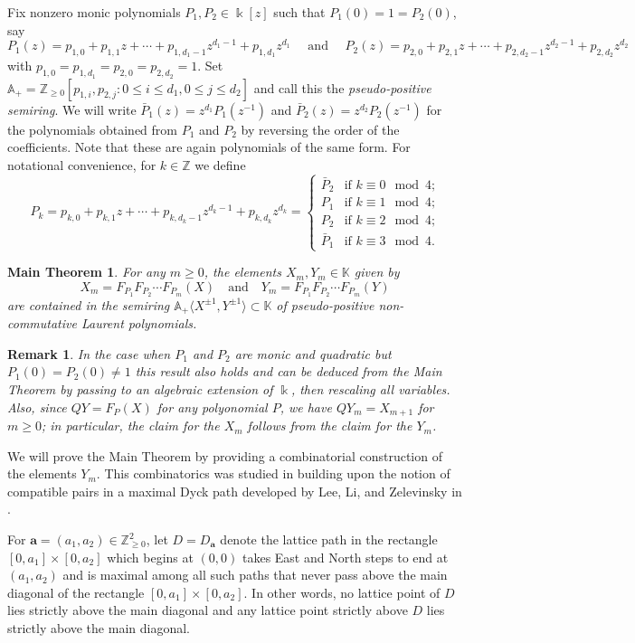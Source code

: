 \documentclass{amsart}
\newtheorem*{maintheorem}{Main Theorem}
\newtheorem*{remark*}{Remark}
\newcommand{\bfa}{\mathbf{a}}
\newcommand{\kk}{\Bbbk}
\renewcommand{\AA}{\mathbb{A}}
\newcommand{\KK}{\mathbb{K}}
\newcommand{\ZZ}{\mathbb{Z}}
\begin{document}
Fix nonzero monic polynomials $P_1,P_2\in\kk[z]$ such that $P_1(0)=1=P_2(0)$, say
\[P_1(z)=p_{1,0}+p_{1,1}z+\cdots+p_{1,d_1-1}z^{d_1-1}+p_{1,d_1}z^{d_1}\quad\!\text{ and }\!\quad P_2(z)=p_{2,0}+p_{2,1}z+\cdots+p_{2,d_2-1}z^{d_2-1}+p_{2,d_2}z^{d_2}\]
with $p_{1,0}=p_{1,d_1}=p_{2,0}=p_{2,d_2}=1$.  Set $\AA_+=\ZZ_{\ge0}[p_{1,i},p_{2,j}:0\le i\le d_1,0\le j\le d_2]$ and call this the \emph{pseudo-positive semiring}.  We will write $\bar{P}_1(z)=z^{d_1}P_1(z^{-1})$ and $\bar{P}_2(z)=z^{d_2}P_2(z^{-1})$ for the polynomials obtained from $P_1$ and $P_2$ by reversing the order of the coefficients.  Note that these are again polynomials of the same form.  For notational convenience, for $k\in\ZZ$ we define 
\[P_k=p_{k,0}+p_{k,1}z+\cdots+p_{k,d_k-1}z^{d_k-1}+p_{k,d_k}z^{d_k}=\begin{cases}\bar{P}_2 & \text{if $k\equiv 0\mod 4$;}\\P_1 & \text{if $k\equiv 1\mod 4$;}\\P_2 & \text{if $k\equiv 2\mod 4$;}\\\bar{P}_1 & \text{if $k\equiv 3\mod 4$.}\end{cases}\]
\begin{maintheorem}\label{th:main}
 For any $m\ge0$, the elements $ X_m, Y_m\in\KK$ given by
 \[ X_m=F_{P_1}F_{P_2}\cdots F_{P_m}(X)\quad\text{and}\quad  Y_m=F_{P_1}F_{P_2}\cdots F_{P_m}(Y)\]
 are contained in the semiring $\AA_+\langle X^{\pm1},Y^{\pm1}\rangle\subset\KK$ of pseudo-positive non-commutative Laurent polynomials.
\end{maintheorem}
\begin{remark*}
 In the case when $P_1$ and $P_2$ are monic and quadratic but $P_1(0)=P_2(0)\ne1$ this result also holds and can be deduced from the Main Theorem by passing to an algebraic extension of $\kk$, then rescaling all variables.  Also, since $QY=F_P(X)$ for any polyonomial $P$, we have $ QY_m=X_{m+1}$ for $m\ge0$; in particular, the claim for the $X_m$ follows from the claim for the $Y_m$.
\end{remark*}

We will prove the Main Theorem by providing a combinatorial construction of the elements $Y_m$.  This combinatorics was studied in \cite{rupel2} building upon the notion of compatible pairs in a maximal Dyck path developed by Lee, Li, and Zelevinsky in \cite{lee-li-zelevinsky}.

For $\bfa=(a_1,a_2)\in\ZZ_{\ge0}^2$, let $D=D_\bfa$ denote the lattice path in the rectangle $[0,a_1]\times[0,a_2]$ which begins at $(0,0)$ takes East and North steps to end at $(a_1,a_2)$ and is maximal among all such paths that never pass above the main diagonal of the rectangle $[0,a_1]\times[0,a_2]$.  In other words, no lattice point of $D$ lies strictly above the main diagonal and any lattice point strictly above $D$ lies strictly above the main diagonal.
\end{document}
